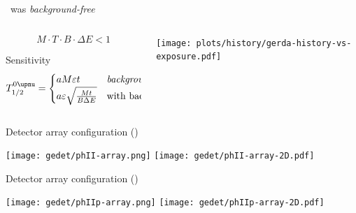 \documentclass[10pt,aspectratio=169]{beamer}
\renewcommand{\epsilon}{\varepsilon}
\begin{document}
\begin{frame}{\gerdatwo\ was \emph{background-free}}
  \begin{columns}
    \begin{column}{0.4\textwidth}
      \begin{simpleblock}
        \alert{%
          \[
            M \cdot T \cdot B \cdot \Delta{E} < 1
          \]
        }
      \end{simpleblock}

      \begin{exampleblock}{Sensitivity}
        \[
          T^{0\upnu}_{1/2} =
          \begin{cases}
            a M \epsilon t & \text{\emph{background-free}} \\
            a \epsilon \sqrt{\frac{M t}{B \Delta{E}}} & \text{with background} \\
          \end{cases}
        \]
      \end{exampleblock}
    \end{column}
    \begin{column}{0.6\textwidth}
      \begin{center}
        \texttt{[image: plots/history/gerda-history-vs-exposure.pdf]}
      \end{center}
    \end{column}
  \end{columns}
\end{frame}
\begin{frame}{Detector array configuration (\phasetwo)}
  \begin{center}
    \texttt{[image: gedet/phII-array.png]}%
    \hspace{0.5cm}%
    \texttt{[image: gedet/phII-array-2D.pdf]}
  \end{center}
\end{frame}
\begin{frame}{Detector array configuration (\phasetwop)}
  \begin{center}
    \texttt{[image: gedet/phIIp-array.png]}%
    \hspace{0.5cm}%
    \texttt{[image: gedet/phIIp-array-2D.pdf]}
  \end{center}
\end{frame}
\end{document}
